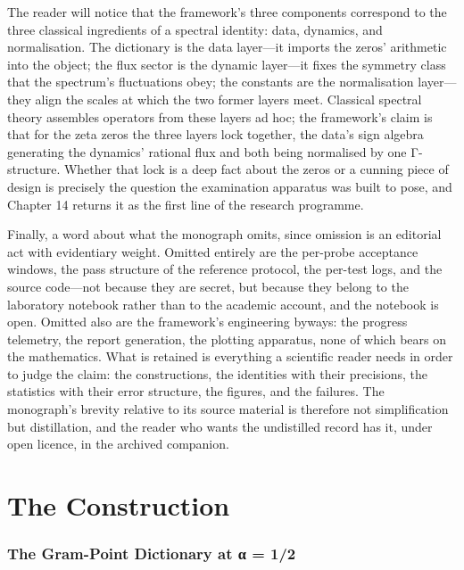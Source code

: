 \documentclass[10pt]{article}
\begin{document}
The reader will notice that the framework's three components correspond to the three classical ingredients of a spectral identity: data, dynamics, and normalisation. The dictionary is the data layer---it imports the zeros' arithmetic into the object; the flux sector is the dynamic layer---it fixes the symmetry class that the spectrum's fluctuations obey; the constants are the normalisation layer---they align the scales at which the two former layers meet. Classical spectral theory assembles operators from these layers ad hoc; the framework's claim is that for the zeta zeros the three layers lock together, the data's sign algebra generating the dynamics' rational flux and both being normalised by one Γ-structure. Whether that lock is a deep fact about the zeros or a cunning piece of design is precisely the question the examination apparatus was built to pose, and Chapter 14 returns it as the first line of the research programme.

Finally, a word about what the monograph omits, since omission is an editorial act with evidentiary weight. Omitted entirely are the per-probe acceptance windows, the pass structure of the reference protocol, the per-test logs, and the source code---not because they are secret, but because they belong to the laboratory notebook rather than to the academic account, and the notebook is open. Omitted also are the framework's engineering byways: the progress telemetry, the report generation, the plotting apparatus, none of which bears on the mathematics. What is retained is everything a scientific reader needs in order to judge the claim: the constructions, the identities with their precisions, the statistics with their error structure, the figures, and the failures. The monograph's brevity relative to its source material is therefore not simplification but distillation, and the reader who wants the undistilled record has it, under open licence, in the archived companion.

\part*{The Construction}
\section{The Gram-Point Dictionary at α = 1/2}\label{sec:ch4}
\end{document}
